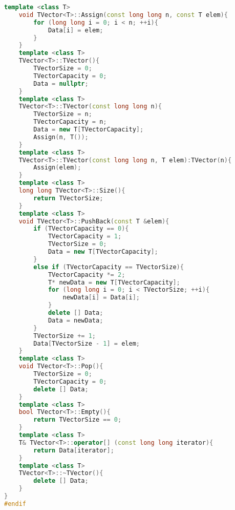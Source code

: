 \begin{lstlisting}[language=C++]
    template <class T>
    void TVector<T>::Assign(const long long n, const T elem){
        for (long long i = 0; i < n; ++i){
            Data[i] = elem;
        }
    }
    template <class T>
    TVector<T>::TVector(){
        TVectorSize = 0;
        TVectorCapacity = 0;
        Data = nullptr;
    }
    template <class T>
    TVector<T>::TVector(const long long n){
        TVectorSize = n;
        TVectorCapacity = n;
        Data = new T[TVectorCapacity];
        Assign(n, T());
    }
    template <class T>
    TVector<T>::TVector(const long long n, T elem):TVector(n){
        Assign(elem);
    }
    template <class T>
    long long TVector<T>::Size(){
        return TVectorSize;
    }
    template <class T>
    void TVector<T>::PushBack(const T &elem){
        if (TVectorCapacity == 0){
            TVectorCapacity = 1;
            TVectorSize = 0;
            Data = new T[TVectorCapacity];
        }
        else if (TVectorCapacity == TVectorSize){
            TVectorCapacity *= 2;
            T* newData = new T[TVectorCapacity];
            for (long long i = 0; i < TVectorSize; ++i){
                newData[i] = Data[i];
            }
            delete [] Data;
            Data = newData;
        }
        TVectorSize += 1;
        Data[TVectorSize - 1] = elem;
    }
    template <class T>
    void TVector<T>::Pop(){
        TVectorSize = 0;
        TVectorCapacity = 0;
        delete [] Data;
    }
    template <class T>
    bool TVector<T>::Empty(){
        return TVectorSize == 0;
    }
    template <class T>
    T& TVector<T>::operator[] (const long long iterator){
        return Data[iterator];
    }
    template <class T>
    TVector<T>::~TVector(){
        delete [] Data;
    }
}
#endif
\end{lstlisting}

